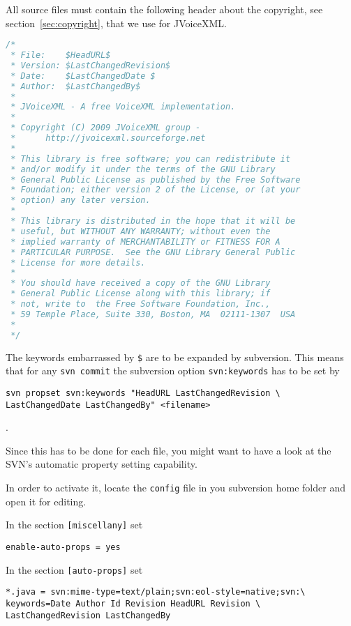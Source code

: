 \documentclass[11pt,a4paper]{article}
\begin{document}
All source files must contain the following header about the 
copyright, see section~\ref{sec:copyright}, that we use for JVoiceXML.

\begin{lstlisting}[language=Java]
/*
 * File:    $HeadURL$
 * Version: $LastChangedRevision$
 * Date:    $LastChangedDate $
 * Author:  $LastChangedBy$
 *
 * JVoiceXML - A free VoiceXML implementation.
 *
 * Copyright (C) 2009 JVoiceXML group - 
 *      http://jvoicexml.sourceforge.net
 *
 * This library is free software; you can redistribute it 
 * and/or modify it under the terms of the GNU Library 
 * General Public License as published by the Free Software 
 * Foundation; either version 2 of the License, or (at your 
 * option) any later version.
 *
 * This library is distributed in the hope that it will be 
 * useful, but WITHOUT ANY WARRANTY; without even the 
 * implied warranty of MERCHANTABILITY or FITNESS FOR A 
 * PARTICULAR PURPOSE.  See the GNU Library General Public 
 * License for more details.
 *
 * You should have received a copy of the GNU Library 
 * General Public License along with this library; if 
 * not, write to  the Free Software Foundation, Inc., 
 * 59 Temple Place, Suite 330, Boston, MA  02111-1307  USA
 *
 */
\end{lstlisting}

The keywords embarrassed by \texttt{\$} are to be expanded by 
subversion. 
This means that for any \texttt{svn commit} the subversion
option \texttt{svn:keywords} has to be set by

\begin{lstlisting}
svn propset svn:keywords "HeadURL LastChangedRevision \
LastChangedDate LastChangedBy" <filename>
\end{lstlisting}.

Since this has to be done for each file, you might want to have a look
at the SVN's automatic property setting capability.

In order to activate it, locate the \texttt{config} file in you subversion home
folder and open it for editing.

In the section \texttt{[miscellany]} set
\begin{lstlisting}
enable-auto-props = yes
\end{lstlisting}

In the section \texttt{[auto-props]} set
\begin{lstlisting}
*.java = svn:mime-type=text/plain;svn:eol-style=native;svn:\
keywords=Date Author Id Revision HeadURL Revision \
LastChangedRevision LastChangedBy
\end{lstlisting}
\end{document}
